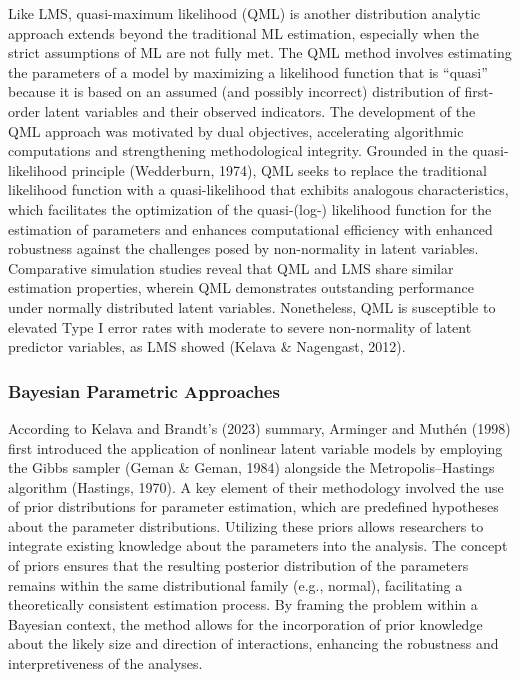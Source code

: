 \documentclass[
  man]{apa7}
\begin{document}
Like LMS, quasi-maximum likelihood (QML) is another distribution analytic approach extends beyond the traditional ML estimation, especially when the strict assumptions of ML are not fully met. The QML method involves estimating the parameters of a model by maximizing a likelihood function that is ``quasi'' because it is based on an assumed (and possibly incorrect) distribution of first-order latent variables and their observed indicators. The development of the QML approach was motivated by dual objectives, accelerating algorithmic computations and strengthening methodological integrity. Grounded in the quasi-likelihood principle (Wedderburn, 1974), QML seeks to replace the traditional likelihood function with a quasi-likelihood that exhibits analogous characteristics, which facilitates the optimization of the quasi-(log-) likelihood function for the estimation of parameters and enhances computational efficiency with enhanced robustness against the challenges posed by non-normality in latent variables. Comparative simulation studies reveal that QML and LMS share similar estimation properties, wherein QML demonstrates outstanding performance under normally distributed latent variables. Nonetheless, QML is susceptible to elevated Type I error rates with moderate to severe non-normality of latent predictor variables, as LMS showed (Kelava \& Nagengast, 2012).

\hypertarget{bayesian-parametric-approaches}{%
\subsubsection{Bayesian Parametric Approaches}\label{bayesian-parametric-approaches}}

According to Kelava and Brandt's (2023) summary, Arminger and Muthén (1998) first introduced the application of nonlinear latent variable models by employing the Gibbs sampler (Geman \& Geman, 1984) alongside the Metropolis--Hastings algorithm (Hastings, 1970). A key element of their methodology involved the use of prior distributions for parameter estimation, which are predefined hypotheses about the parameter distributions. Utilizing these priors allows researchers to integrate existing knowledge about the parameters into the analysis. The concept of priors ensures that the resulting posterior distribution of the parameters remains within the same distributional family (e.g., normal), facilitating a theoretically consistent estimation process. By framing the problem within a Bayesian context, the method allows for the incorporation of prior knowledge about the likely size and direction of interactions, enhancing the robustness and interpretiveness of the analyses.
\end{document}
